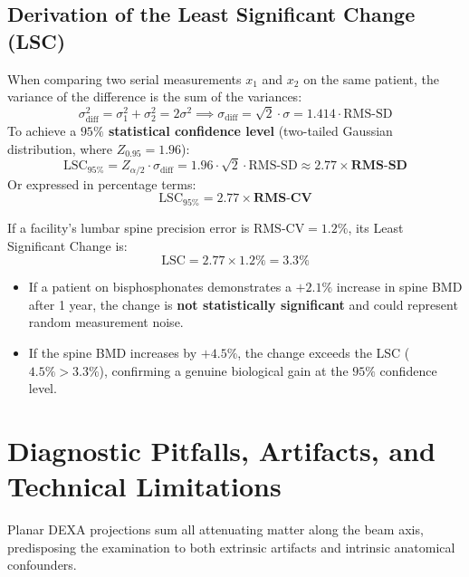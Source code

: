 \documentclass[11pt,a4paper]{article}
\begin{document}
\subsection{Derivation of the Least Significant Change (LSC)}

When comparing two serial measurements $x_1$ and $x_2$ on the same patient, the variance of the difference is the sum of the variances:
\begin{equation}
    \sigma_{\text{diff}}^2 = \sigma_1^2 + \sigma_2^2 = 2 \sigma^2 \implies \sigma_{\text{diff}} = \sqrt{2} \cdot \sigma = 1.414 \cdot \text{RMS-SD}
\end{equation}
To achieve a \textbf{$95\%$ statistical confidence level} (two-tailed Gaussian distribution, where $Z_{0.95} = 1.96$):
\begin{equation}
    \text{LSC}_{95\%} = Z_{\alpha/2} \cdot \sigma_{\text{diff}} = 1.96 \cdot \sqrt{2} \cdot \text{RMS-SD} \approx \mathbf{2.77 \times \text{RMS-SD}}
\end{equation}
Or expressed in percentage terms:
\begin{equation}
    \text{LSC}_{95\%} = \mathbf{2.77 \times \text{RMS-CV}}
\end{equation}

\begin{qcbox}
If a facility's lumbar spine precision error is $\text{RMS-CV} = 1.2\%$, its Least Significant Change is:
\begin{equation}
    \text{LSC} = 2.77 \times 1.2\% = \mathbf{3.3\%}
\end{equation}
\begin{itemize}[leftmargin=*]
    \item If a patient on bisphosphonates demonstrates a $+2.1\%$ increase in spine BMD after 1 year, the change is \textbf{not statistically significant} and could represent random measurement noise.
    \item If the spine BMD increases by $+4.5\%$, the change exceeds the LSC ($4.5\% > 3.3\%$), confirming a genuine biological gain at the $95\%$ confidence level.
\end{itemize}
\end{qcbox}

\newpage
\section{Diagnostic Pitfalls, Artifacts, and Technical Limitations}

Planar DEXA projections sum all attenuating matter along the beam axis, predisposing the examination to both extrinsic artifacts and intrinsic anatomical confounders.
\end{document}
